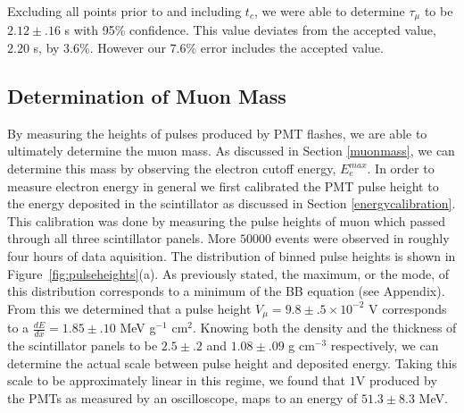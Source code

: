 Excluding all points prior to and including $t_{c}$, we were able to determine $\tau_{\mu}$ to be $2.12 \pm .16$ \mu s with 95\% confidence.  This value deviates from the accepted value, $2.20$ \mu s, by $3.6\%$.  However our $7.6\%$ error includes the accepted value.






\subsection{Determination of Muon Mass}\label{determinationofmuonmass}

By measuring the heights of pulses produced by PMT flashes, we are
able to ultimately determine the muon mass.  As discussed in Section
\ref{muonmass}, we can determine this mass by observing the electron cutoff energy, $E_{e}^{max}$. In order to measure electron energy in general
we first calibrated the PMT pulse height to the energy deposited in
the scintillator as discussed in Section \ref{energycalibration}. This calibration
was done by measuring the pulse heights of muon which passed through
all three scintillator panels.  More $50000$ events were observed in
roughly four hours of data aquisition.  The distribution of binned
pulse heights is shown in Figure~\ref{fig:pulseheights}(a).  As previously stated, the
maximum, or the mode, of this distribution corresponds to a minimum of
the BB equation (see Appendix).  From this we determined that a pulse
height $V_{\mu} = 9.8\pm.5 \times 10^{-2}$ V corresponds to a $\frac{dE}{dx}= 1.85\pm.10$ MeV
g$^{-1}$ cm$^{2}$.  Knowing both the density and the thickness of the
scintillator panels to be $2.5\pm.2$ and $1.08\pm.09$ g cm$^{-3}$ respectively, we can determine
the actual scale between pulse height and deposited energy.  Taking
this scale to be approximately linear in this regime, we found that
$1$V produced by the PMTs as measured by an oscilloscope, maps to an
energy of $51.3 \pm 8.3$ MeV.



